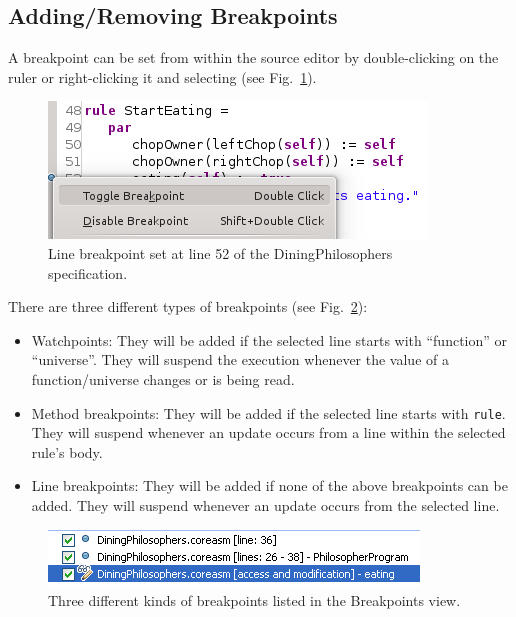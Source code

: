 \documentclass[10pt,oneside,a4paper]{article}
\begin{document}
\subsection{Adding/Removing Breakpoints}
A breakpoint can be set from within the source editor by double-clicking on the ruler or right-clicking it and selecting  (see Fig.~\ref{fig:breakpoint-inside-editor}).

\begin{figure}[h]
\centering
\includegraphics[scale=0.5]{images/line-breakpoint.png}
\caption{Line breakpoint set at line 52 of the DiningPhilosophers specification.}
\label{fig:breakpoint-inside-editor}
\end{figure}

There are three different types of breakpoints (see Fig.~\ref{fig:breakpoint-view}):
\begin{itemize}
  \item Watchpoints: They will be added if the selected line starts with
  ``function'' or ``universe''. They will suspend the execution whenever the value of a
  function/universe changes or is being read.
  \item Method breakpoints: They will be added if the selected line starts with
  \texttt{rule}. They will suspend whenever an update occurs from a line within the
  selected rule's body.
  \item Line breakpoints: They will be added if none of the above breakpoints can
  be added. They will suspend whenever an update occurs from the selected line.
\end{itemize}

\begin{figure}[h]
	\centering
	\includegraphics[scale=0.6]{images/debug-view-breakpoints.png}
	\caption{Three different kinds of breakpoints listed in the Breakpoints view.}
	\label{fig:breakpoint-view}
\end{figure}
\end{document}
